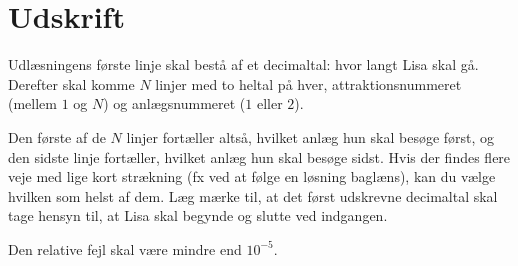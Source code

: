 \section*{Udskrift}
Udlæsningens første linje skal bestå af et decimaltal: hvor langt Lisa skal gå. 
Derefter skal komme $N$ linjer med to heltal på hver, attraktionsnummeret (mellem $1$ og $N$) og anlægsnummeret ($1$ eller $2$).

Den første af de $N$ linjer fortæller altså, hvilket anlæg hun skal besøge først, og den sidste linje fortæller, hvilket anlæg hun skal besøge sidst.
Hvis der findes flere veje med lige kort strækning (fx ved at følge en løsning baglæns), kan du vælge hvilken som helst af dem.
Læg mærke til, at det først udskrevne decimaltal skal tage hensyn til, at Lisa skal begynde og slutte ved indgangen.

Den relative fejl skal være mindre end $10^{-5}$.
